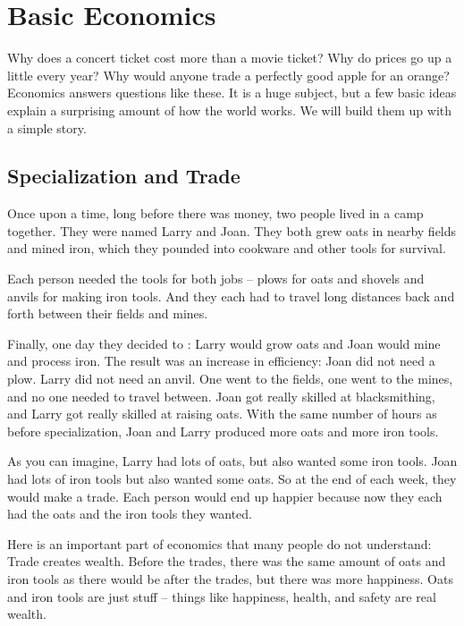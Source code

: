 \chapter{Basic Economics}

Why does a concert ticket cost more than a movie ticket? Why do prices go
up a little every year? Why would anyone trade a perfectly good apple for
an orange? Economics answers questions like these. It is a huge subject,
but a few basic ideas explain a surprising amount of how the world works.
We will build them up with a simple story.

\section{Specialization and Trade}

Once upon a time, long before there was money, two people lived in a camp together. They were named Larry and Joan. They both grew oats in nearby fields and mined iron, which they pounded into cookware and other tools for survival. 

Each person needed the tools for both jobs -- plows for oats and shovels and anvils for making iron tools.  And they each had to travel long distances back and forth between their fields and mines.

Finally, one day they decided to : Larry would grow oats and Joan would mine and process iron.  The result was an increase in efficiency: Joan did not need a plow. Larry did not need an anvil. One went to the fields, one went to the mines, and no one needed to travel between. Joan got really skilled at blacksmithing, and Larry got really skilled at raising oats.  With the same number of hours as before specialization, Joan and Larry produced more oats and more iron tools.

As you can imagine,  Larry had lots of oats, but also wanted some iron tools.  Joan had lots of iron tools but also wanted some oats.  So at the end of each week, they would make a trade.  Each person would end up happier because now they each had the oats and the iron tools they wanted.

Here is an important part of economics that many people do not understand: Trade creates wealth.  Before the trades, there was the same amount of oats and iron tools as there would be after the trades, but there was more happiness.  Oats and iron tools are just stuff -- things like happiness, health, and safety are real wealth.

